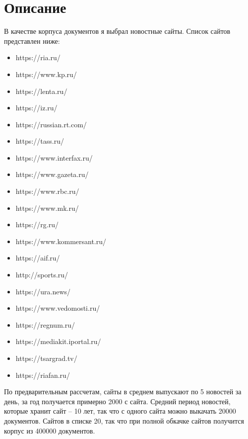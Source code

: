 \section{Описание}
В качестве корпуса документов я выбрал новостные сайты. Список сайтов представлен ниже:

\begin{itemize}
\item https://ria.ru/
\item https://www.kp.ru/
\item https://lenta.ru/
\item https://iz.ru/
\item https://russian.rt.com/
\item https://tass.ru/
\item https://www.interfax.ru/
\item https://www.gazeta.ru/
\item https://www.rbc.ru/
\item https://www.mk.ru/
\item https://rg.ru/
\item https://www.kommersant.ru/
\item https://aif.ru/
\item http://sports.ru/
\item https://ura.news/
\item https://www.vedomosti.ru/
\item https://regnum.ru/
\item https://mediakit.iportal.ru/
\item https://tsargrad.tv/
\item https://riafan.ru/
\end{itemize}

По предварительным рассчетам, сайты в среднем выпускают по 5 новостей за день, за год получается примерно 2000 с сайта. Средний период новостей, которые хранит сайт -- 10 лет, так что с одного сайта можно выкачать 20000 документов. Сайтов в списке 20, так что при полной обкачке сайтов получится корпус из 400000 документов.
\pagebreak

